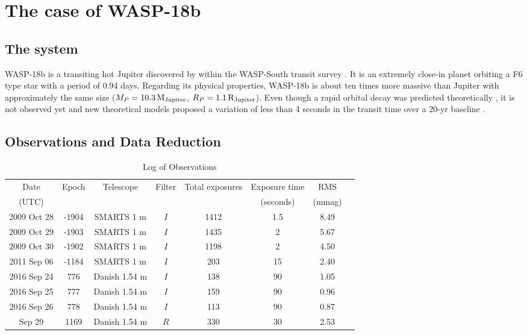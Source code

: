 \chapter{The case of WASP-18b}\label{chap:wasp18}

\section{The system}
WASP-18b is a transiting hot Jupiter discovered by \cite{Hellier2009} within the WASP-South transit survey \citep{Pollacco2006}. It is an extremely close-in planet orbiting a F6 type star with a period of 0.94 days. Regarding its physical properties, WASP-18b is about ten times more massive than Jupiter with approximately the same size ($M_{P}=10.3\,{\rm M_{Jupiter}}$, $R_{P}=1.1\,{\rm R_{Jupiter}}$). Even though a rapid orbital decay was predicted theoretically \citep{Hellier2009}, it is not observed yet \citep{Wilkins2017} and new theoretical models proposed a variation of less than 4 seconds in the transit time over a 20-yr baseline \citep{CollierCameron2018}. 

\section{Observations and Data Reduction}

\begin{table}
\caption{Log of Observations}             
\label{log_table}      
\centering          
\begin{tabular}{cccccccc}
\hline\hline       
 Date & Epoch\footnotemark{a} & Telescope & Filter & Total exposures & Exposure time\footnotemark{b} & RMS\footnotemark{c} \\
 (UTC) &       &           &       &                   & (seconds) & (mmag)\\
\hline  
 2009 Oct 28 &-1904 & SMARTS 1 m & $I$ & 1412 & 1.5 & 8.49  \\
 2009 Oct 29 & -1903 & SMARTS 1 m & $I$ & 1435 & 2 & 5.67 \\
2009 Oct 30 & -1902 & SMARTS 1 m & $I$ & 1198 & 2  & 4.50 \\
 2011 Sep 06 & -1184 & SMARTS 1 m & $I$ & 203 & 15 & 2.40 \\
2016 Sep 24\footnotemark{d} & 776 & Danish 1.54 m & $I$ & 138 & 90 & 1.05  \\
2016 Sep 25\footnotemark{d} & 777 &Danish 1.54 m & $I$ & 159 & 90  & 0.96  \\
2016 Sep 26\footnotemark{d} & 778 & Danish 1.54 m & $I$ & 113 & 90 & 0.87  \\ \smallskip
2017 Sep 29\footnotemark{d} & 1169 & Danish 1.54 m & $R$ & 330 & 30 & 2.53 \\
\hline                  
\end{tabular}
\end{table}


